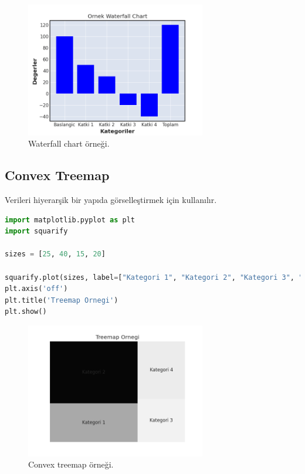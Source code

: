 \begin{figure}[h]
    \centering
    \includegraphics[width=0.7\textwidth]{images/waterfall_chart.png}
    \caption{Waterfall chart örneği.}
    \label{fig:enter-label}
\end{figure}

\newpage

\subsection{Convex Treemap}
Verileri hiyerarşik bir yapıda görselleştirmek için kullanılır.

\begin{lstlisting}[language=Python]
import matplotlib.pyplot as plt
import squarify

sizes = [25, 40, 15, 20]

squarify.plot(sizes, label=["Kategori 1", "Kategori 2", "Kategori 3", "Kategori 4"])
plt.axis('off')
plt.title('Treemap Ornegi')
plt.show()
\end{lstlisting}

\begin{figure}[h]
    \centering
    \includegraphics[width=0.7\textwidth]{images/convex_treemap.png}
    \caption{Convex treemap örneği.}
    \label{fig:enter-label}
\end{figure}

